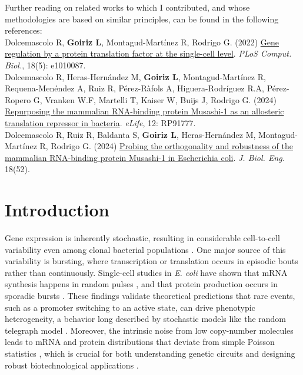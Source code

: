 \noindent Further reading on related works to which I contributed, and whose methodologies are based on similar principles, can be found in the following references:\\

\noindent Dolcemascolo R, \textbf{Goiriz L}, Montagud-Martínez R, Rodrigo G. (2022) \href{https://doi.org/10.1371/journal.pcbi.1010087}{Gene regulation by a protein translation factor at the single-cell level}. \textit{PLoS Comput. Biol.}, 18(5): e1010087.\\

\noindent Dolcemascolo R, Heras-Hernández M, \textbf{Goiriz L}, Montagud-Martínez R, Requena-Menéndez A, Ruiz R, Pérez-Ràfols A, Higuera-Rodríguez R.A, Pérez-Ropero G, Vranken W.F, Martelli T, Kaiser W, Buijs J, Rodrigo G. (2024) \href{https://doi.org/10.7554/eLife.91777.3}{Repurposing the mammalian RNA-binding protein Musashi-1 as an allosteric translation repressor in bacteria}. \textit{eLife}, 12: RP91777.\\

\noindent Dolcemascolo R, Ruiz R, Baldanta S, \textbf{Goiriz L}, Heras-Hernández M, Montagud-Martínez R, Rodrigo G. (2024) \href{https://doi.org/10.1186/s13036-024-00448-x}{Probing the orthogonality and robustness of the mammalian RNA-binding protein Musashi-1 in Escherichia coli}. \textit{J. Biol. Eng.} 18(52).\\

\vfill

\pagebreak

\sloppy

\section*{Introduction}

Gene expression is inherently stochastic, resulting in considerable cell-to-cell variability even among clonal bacterial populations \cite{Elowitz2002,Swain2002}. One major source of this variability is bursting, where transcription or translation occurs in episodic bouts rather than continuously. Single-cell studies in \textit{E. coli} have shown that mRNA synthesis happens in random pulses \cite{Golding2005}, and that protein production occurs in sporadic bursts \cite{Yu2006}. These findings validate theoretical predictions that rare events, such as a promoter switching to an active state, can drive phenotypic heterogeneity, a behavior long described by stochastic models like the random telegraph model \cite{McAdams1997}. Moreover, the intrinsic noise from low copy-number molecules leads to mRNA and protein distributions that deviate from simple Poisson statistics \cite{Paulsson2004}, which is crucial for both understanding genetic circuits and designing robust biotechnological applications \cite{Taniguchi2010}.

